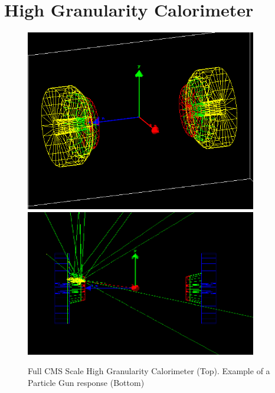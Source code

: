 \section{High Granularity Calorimeter} \label{section:simulations_hgc}
\begin{figure}[htbp]
    \centering
    \includegraphics[width=0.9\textwidth]{figures/ch_simulations/hgc/detetor_3d/HGC_70_20.png}
    \includegraphics[width=0.9\textwidth]{figures/ch_simulations/hgc/detetor_3d/HGCal_1Event_NoSides.png}
    \caption{Full CMS Scale High Granularity Calorimeter (Top). Example of a Particle Gun response (Bottom)}
    \label{fig:simulations_hgcexamples}
 \end{figure}

